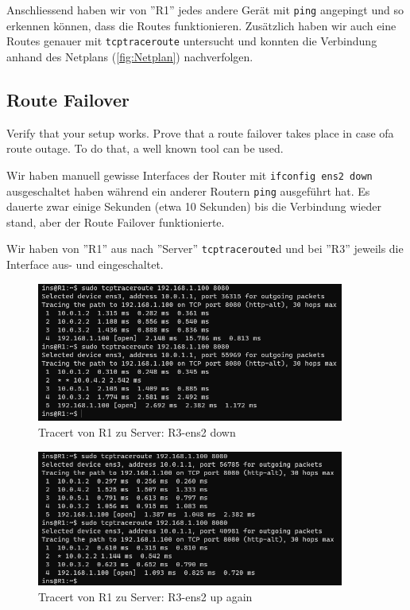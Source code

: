\documentclass[11pt,titlepage]{article}
\newenvironment{shadedquotation}
 {\begin{shaded*}
  \quoting[leftmargin=0pt, vskip=0pt]
 }
 {\endquoting
 \end{shaded*}
}
\begin{document}
Anschliessend haben wir von ''R1'' jedes andere Gerät mit \lstinline!ping! angepingt und so erkennen können, dass die Routes funktionieren. Zusätzlich haben wir auch eine Routes genauer mit \lstinline!tcptraceroute! untersucht und konnten die Verbindung anhand des Netplans (\autoref{fig:Netplan}) nachverfolgen.  

\subsection{Route Failover}
\label{subsec:RouteFailover}
\begin{shadedquotation}
  Verify that your setup works. Prove that a route failover takes place in case ofa route outage. To do that, a well known tool can be used.
\end{shadedquotation}

Wir haben manuell gewisse Interfaces der Router mit \lstinline!ifconfig ens2 down! ausgeschaltet haben während ein anderer Routern \lstinline!ping! ausgeführt hat. Es dauerte zwar einige Sekunden (etwa 10 Sekunden) bis die Verbindung wieder stand, aber der Route Failover funktionierte.

\medskip

Wir haben von ''R1'' aus nach ''Server'' \lstinline!tcptraceroute!d und bei ''R3'' jeweils die Interface aus- und eingeschaltet.

\begin{figure}[H]
  \begin{center}
    \includegraphics[width=0.90\textwidth]{images/tcptracert_R3-ens2-down.png}
    \caption{Tracert von R1 zu Server: R3-ens2 down}
    \label{fig:Netplan}
  \end{center}
\end{figure}

\begin{figure}[H]
  \begin{center}
    \includegraphics[width=0.90\textwidth]{images/tcptracert_R3-ens2-up.png}
    \caption{Tracert von R1 zu Server: R3-ens2 up again}
    \label{fig:Netplan}
  \end{center}
\end{figure}
\end{document}
